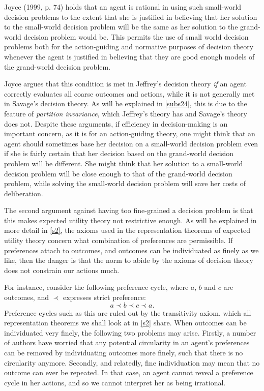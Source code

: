 Joyce (1999, p. 74) holds that an agent is rational in using such small-world decision problems to the extent that she is justified in believing that her solution to the small-world decision problem will be the same as her solution to the grand-world decision problem would be. This permits the use of small world decision problems both for the action-guiding and normative purposes of decision theory whenever the agent is justified in believing that they are good enough models of the grand-world decision problem.

Joyce argues that this condition is met in Jeffrey's decision theory {\em if} an agent correctly evaluates all coarse outcomes and actions, while it is not generally met in Savage's decision theory. As will be explained in \autoref{subs24}, this is due to the feature of {\em partition invariance}, which Jeffrey's theory has and Savage's theory does not. Despite these arguments, if efficiency in decision-making is an important concern, as it is for an action-guiding theory, one might think that an agent should sometimes base her decision on a small-world decision problem even if she is fairly certain that her decision based on the grand-world decision problem will be different. She might think that her solution to a small-world decision problem will be close enough to that of the grand-world decision problem, while solving the small-world decision problem will save her costs of deliberation.

The second argument against having too fine-grained a decision problem is that this makes expected utility theory not restrictive enough. As will be explained in more detail in \autoref{s2}, the axioms used in the representation theorems of expected utility theory concern what combination of preferences are permissible. If preferences attach to outcomes, and outcomes can be individuated as finely as we like, then the danger is that the norm to abide by the axioms of decision theory does not constrain our actions much.

For instance, consider the following preference cycle, where $a$, $b$ and $c$ are outcomes, and $\prec$ expresses strict preference:
$$a \prec b \prec c \prec a.$$
Preference cycles such as this are ruled out by the transitivity axiom, which all representation theorems we shall look at in \autoref{s2} share. When outcomes can be individuated very finely, the following two problems may arise. Firstly, a number of authors have worried that any potential circularity in an agent's preferences can be removed by individuating outcomes more finely, such that there is no circularity anymore. Secondly, and relatedly, fine individuation may mean that no outcome can ever be repeated. In that case, an agent cannot reveal a preference cycle in her actions, and so we cannot interpret her as being irrational.

